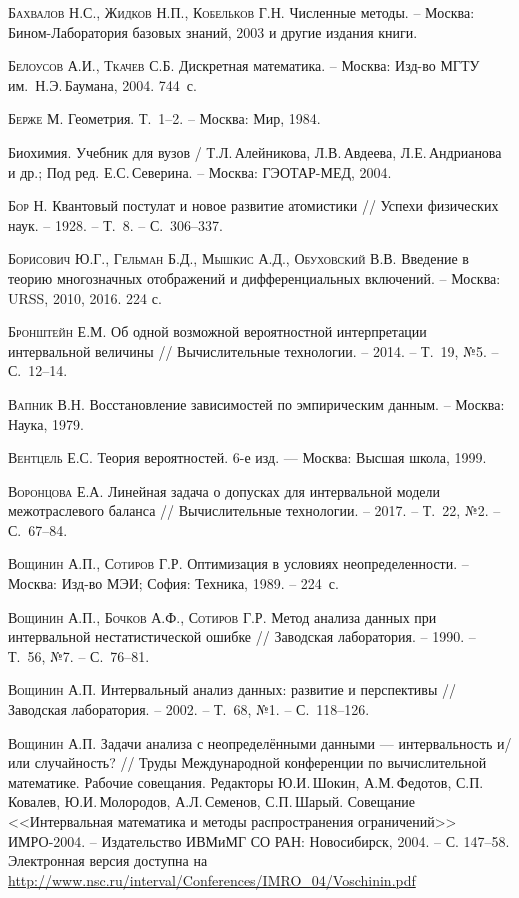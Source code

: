 \documentclass[a5paper,openany]{book}
\begin{document}
\begin{thebibliography}{999}
\textsc{Бахвалов Н.С., Жидков Н.П., Кобельков Г.Н.} Численные методы. -- Москва: 
Бином-Лаборатория базовых знаний, 2003 и другие издания книги. 
  
\textsc{Белоусов А.И., Ткачев С.Б.} Дискретная математика. --  Москва: Изд-во МГТУ 
им.~Н.Э.\,Баумана, 2004. 744~с. 
  
\textsc{Берже М.} Геометрия. Т.~1--2. -- Москва: Мир, 1984. 
  
Биохимия. Учебник для вузов / Т.Л.\,Алейникова, Л.В.\,Авдеева, Л.Е.\,Андрианова и др.; 
Под ред. Е.С.\,Северина. -- Москва: ГЭОТАР-МЕД, 2004. 
  
\textsc{Бор Н.} Квантовый постулат и новое развитие атомистики // Успехи физических наук. 
-- 1928. -- Т.~8. -- С.~306--337. 
  
\textsc{Борисович Ю.Г., Гельман Б.Д., Мышкис А.Д., Обуховский В.В.} Введение в теорию 
многозначных отображений и дифференциальных включений. -- Москва: URSS, 2010, 2016. 224 с.  
  
\textsc{Бронштейн Е.М.} Об одной возможной вероятностной интерпретации интервальной 
величины // Вычислительные технологии. -- 2014. -- Т.~19, №5. -- С.~12--14. 
  
\textsc{Вапник В.Н.} Восстановление зависимостей по эмпирическим данным. -- Москва: 
Наука, 1979. 
    
\textsc{Вентцель Е.С.} Теория вероятностей. 6-е изд. — Москва: Высшая школа, 1999. 
  
\textsc{Воронцова Е.А.} Линейная задача о допусках для интервальной модели межотраслевого 
баланса // Вычислительные технологии. -- 2017. -- Т.~22, №2. -- С.~67--84. 
  
\textsc{Вощинин А.П., Сотиров Г.Р.} Оптимизация в условиях неопределенности. 
-- Москва: Изд-во МЭИ; София: Техника, 1989. -- 224~с. 
  
\textsc{Вощинин А.П., Бочков А.Ф., Сотиров Г.Р.} Метод анализа данных при интервальной 
нестатистической ошибке // Заводская лаборатория. -- 1990. -- Т.~56, №7. -- С.~76--81.
  
\textsc{Вощинин А.П.} Интервальный анализ данных: развитие и перспективы // Заводская 
лаборатория. -- 2002. -- Т.~68, №1. -- С.~118--126. 
  
\textsc{Вощинин А.П.} Задачи анализа с неопределёнными данными --- интервальность 
и/или случайность?  // Труды Международной конференции по вычислительной математике. 
Рабочие совещания. Редакторы Ю.И.\,Шокин, А.М.\,Федотов, С.П.\,Ковалев, Ю.И.\,Молородов, 
А.Л.\,Семенов, С.П.\,Шарый. Совещание <<Интервальная математика и методы распространения 
ограничений>> ИМРО-2004. -- Издательство ИВМиМГ СО РАН: Новосибирск, 2004. 
-- С. 147--58.   Электронная версия доступна на  
\url{http://www.nsc.ru/interval/Conferences/IMRO_04/Voschinin.pdf} 
  

\end{thebibliography}
\end{document}
